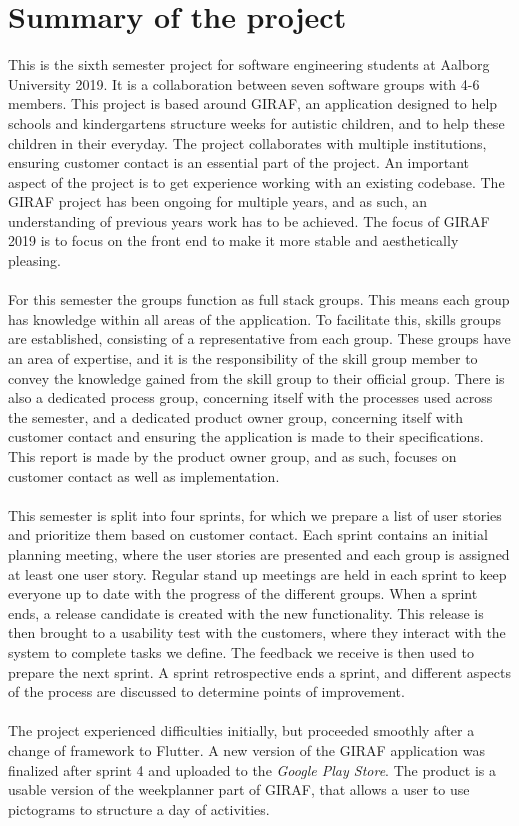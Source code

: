 \chapter{Summary of the project}\label{appendix:project-summary}
This is the sixth semester project for software engineering students at Aalborg University 2019.
It is a collaboration between seven software groups with 4-6 members.
This project is based around GIRAF, an application designed to help schools and kindergartens structure weeks for autistic children, and to help these children in their everyday.
The project collaborates with multiple institutions, ensuring customer contact is an essential part of the project.
An important aspect of the project is to get experience working with an existing codebase. 
The GIRAF project has been ongoing for multiple years, and as such, an understanding of previous years work has to be achieved.
The focus of GIRAF 2019 is to focus on the front end to make it more stable and aesthetically pleasing.
\\\\
For this semester the groups function as full stack groups.
This means each group has knowledge within all areas of the application.
To facilitate this, skills groups are established, consisting of a representative from each group.
These groups have an area of expertise, and it is the responsibility of the skill group member to convey the knowledge gained from the skill group to their official group.
There is also a dedicated process group, concerning itself with the processes used across the semester, and a dedicated product owner group, concerning itself with customer contact and ensuring the application is made to their specifications.
This report is made by the product owner group, and as such, focuses on customer contact as well as implementation.
\\\\
This semester is split into four sprints, for which we prepare a list of user stories and prioritize them based on customer contact.
Each sprint contains an initial planning meeting, where the user stories are presented and each group is assigned at least one user story.
Regular stand up meetings are held in each sprint to keep everyone up to date with the progress of the different groups.
When a sprint ends, a release candidate is created with the new functionality.
This release is then brought to a usability test with the customers, where they interact with the system to complete tasks we define.
The feedback we receive is then used to prepare the next sprint.
A sprint retrospective ends a sprint, and different aspects of the process are discussed to determine points of improvement.
\\\\
The project experienced difficulties initially, but proceeded smoothly after a change of framework to Flutter.
A new version of the GIRAF application was finalized after sprint 4 and uploaded to the \textit{Google Play Store}.
The product is a usable version of the weekplanner part of GIRAF, that allows a user to use pictograms to structure a day of activities.
